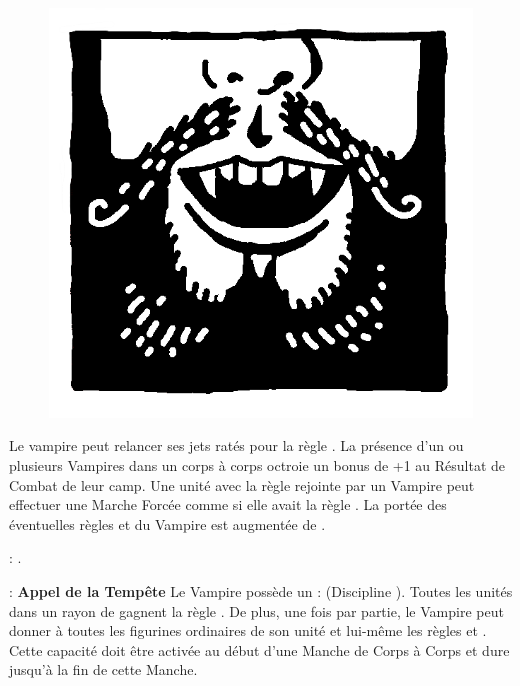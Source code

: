 
\begin{figure}
\centering
\includegraphics[width=\logosize]{pics/logo_vonkarnstein.png}
\end{figure}
Le vampire peut relancer ses jets ratés pour la règle \vampiric{}. La présence d'un ou plusieurs Vampires \vonkarnstein{} dans un corps à corps octroie un bonus de +1 au Résultat de Combat de leur camp. Une unité avec la règle \undead{} rejointe par un Vampire \vonkarnstein{} peut effectuer une Marche Forcée comme si elle avait la règle \vampiric{}. La portée des éventuelles règles \inspiringpresence{} et \holdyourground{} du Vampire est augmentée de . 

\vspace{0.5cm}
\bloodties{} : \textbf{\darkcoach{}}.

\vspace{0.5cm}
\ancientbloodpower{} : \textbf{Appel de la Tempête}\dotfill{}\newline%
Le Vampire possède un  : \heavensspelltwo{} (Discipline \heavens{}). Toutes les unités dans un rayon de  gagnent la règle \hardtarget{}. De plus, une fois par partie, le Vampire peut donner à toutes les figurines ordinaires de son unité et lui-même les règles \lightningattacks{} et \lightningreflexes{}. Cette capacité doit être activée au début d'une Manche de Corps à Corps et dure jusqu'à la fin de cette Manche.

